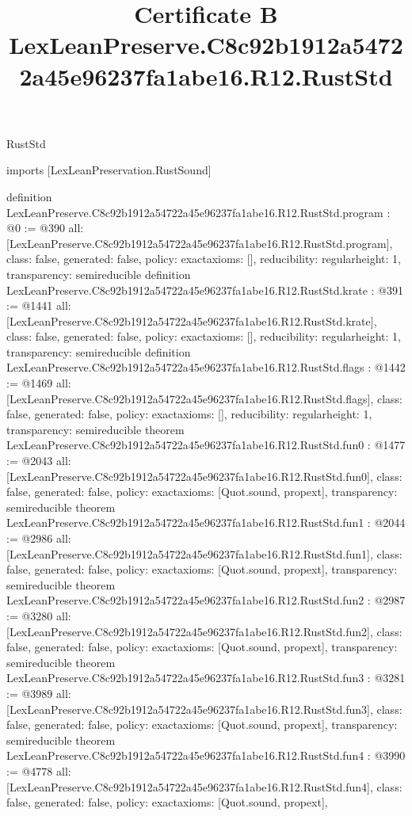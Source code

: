 \begin{lexlean}{RustStd}
\title{Certificate B LexLeanPreserve.C8c92b1912a54722a45e96237fa1abe16.R12.RustStd}
\begin{coremodule}
imports [LexLeanPreservation.RustSound]

definition LexLeanPreserve.C8c92b1912a54722a45e96237fa1abe16.R12.RustStd.program : @0 := @390 {
  all: [LexLeanPreserve.C8c92b1912a54722a45e96237fa1abe16.R12.RustStd.program],
  class: false,
  generated: false,
  policy: exact{axioms: []},
  reducibility: regular{height: 1},
  transparency: semireducible
}
definition LexLeanPreserve.C8c92b1912a54722a45e96237fa1abe16.R12.RustStd.krate : @391 := @1441 {
  all: [LexLeanPreserve.C8c92b1912a54722a45e96237fa1abe16.R12.RustStd.krate],
  class: false,
  generated: false,
  policy: exact{axioms: []},
  reducibility: regular{height: 1},
  transparency: semireducible
}
definition LexLeanPreserve.C8c92b1912a54722a45e96237fa1abe16.R12.RustStd.flags : @1442 := @1469 {
  all: [LexLeanPreserve.C8c92b1912a54722a45e96237fa1abe16.R12.RustStd.flags],
  class: false,
  generated: false,
  policy: exact{axioms: []},
  reducibility: regular{height: 1},
  transparency: semireducible
}
theorem LexLeanPreserve.C8c92b1912a54722a45e96237fa1abe16.R12.RustStd.fun0 : @1477 := @2043 {
  all: [LexLeanPreserve.C8c92b1912a54722a45e96237fa1abe16.R12.RustStd.fun0],
  class: false,
  generated: false,
  policy: exact{axioms: [Quot.sound, propext]},
  transparency: semireducible
}
theorem LexLeanPreserve.C8c92b1912a54722a45e96237fa1abe16.R12.RustStd.fun1 : @2044 := @2986 {
  all: [LexLeanPreserve.C8c92b1912a54722a45e96237fa1abe16.R12.RustStd.fun1],
  class: false,
  generated: false,
  policy: exact{axioms: [Quot.sound, propext]},
  transparency: semireducible
}
theorem LexLeanPreserve.C8c92b1912a54722a45e96237fa1abe16.R12.RustStd.fun2 : @2987 := @3280 {
  all: [LexLeanPreserve.C8c92b1912a54722a45e96237fa1abe16.R12.RustStd.fun2],
  class: false,
  generated: false,
  policy: exact{axioms: [Quot.sound, propext]},
  transparency: semireducible
}
theorem LexLeanPreserve.C8c92b1912a54722a45e96237fa1abe16.R12.RustStd.fun3 : @3281 := @3989 {
  all: [LexLeanPreserve.C8c92b1912a54722a45e96237fa1abe16.R12.RustStd.fun3],
  class: false,
  generated: false,
  policy: exact{axioms: [Quot.sound, propext]},
  transparency: semireducible
}
theorem LexLeanPreserve.C8c92b1912a54722a45e96237fa1abe16.R12.RustStd.fun4 : @3990 := @4778 {
  all: [LexLeanPreserve.C8c92b1912a54722a45e96237fa1abe16.R12.RustStd.fun4],
  class: false,
  generated: false,
  policy: exact{axioms: [Quot.sound, propext]},
}
\end{coremodule}
\end{lexlean}
